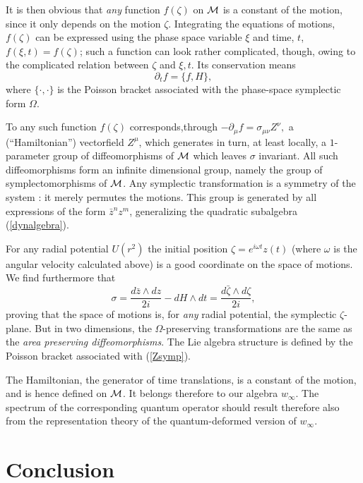 \documentclass[a4paper,11pt]{article}
\let\ssection=\section
\renewcommand{\section}{\setcounter{equation}{0}\ssection}
\def\p{{\partial}}
\begin{document}
It is then obvious that {\it any} function $f(\zeta)$ on ${\cal M}$ is
a constant of the motion, since it only depends on the motion $\zeta$.
Integrating the equations of motions, $f(\zeta)$ can be expressed using
the phase space variable $\xi$ and time, $t$,
$f(\xi, t)=f(\zeta)$;
such a function can look rather complicated, though,
owing to the complicated relation between $\zeta$ and $\xi, t$.
Its conservation means
\begin{equation}
     \p_{t}f=\{f,H\},
\label{conservation}
\end{equation}
where $\{\cdot,\cdot\}$ is the Poisson bracket associated
with the phase-space symplectic form $\Omega$.

To any such function $f(\zeta)$ corresponds,through
$
-\partial_{\mu}f=\sigma_{\mu\nu}Z^\nu,
$
a (``Hamiltonian'')  vectorfield $Z^\mu$,
which generates in turn, at least locally, a $1$-parameter
group of diffeomorphisms of ${\cal M}$ which leaves
$\sigma$ invariant.
All such diffeomorphisms
form an infinite dimensional group, namely the group of
symplectomorphisms  of ${\cal M}$. Any symplectic transformation is a
symmetry of the system : it merely permutes the motions. This group is
generated by all expressions of the form $\bar{z}^nz^m$, generalizing
the quadratic subalgebra (\ref{dynalgebra}).

For any radial potential $U(r^2)$  the initial position
$\zeta=e^{i\omega t}z(t)$
(where $\omega$ is the angular velocity
calculated above)
is a good coordinate on the space of motions.
We find furthermore that
\begin{equation}
     \sigma=\frac{d\bar{z}\wedge dz}{2i}-dH\wedge dt
     =\frac{d\bar{\zeta}\wedge d\zeta}{2i},
     \label{Zsymp}
\end{equation}
proving that the space of  motions is, for {\it any} radial potential,
the symplectic $\zeta$-plane.
But in two dimensions, the $\Omega$-preserving transformations
are the same as the {\it area preserving
diffeomorphisms}. The Lie algebra structure is defined by the
Poisson bracket associated with (\ref{Zsymp}).


The Hamiltonian, the generator of time translations,
is a constant of the motion, and is hence defined
on ${\cal M}$. It
belongs therefore to our algebra $w_{\infty}$. The spectrum of the
corresponding
quantum operator should  result therefore also from the representation
theory of the quantum-deformed version of $w_{\infty}$.

\section{Conclusion}
\end{document}
